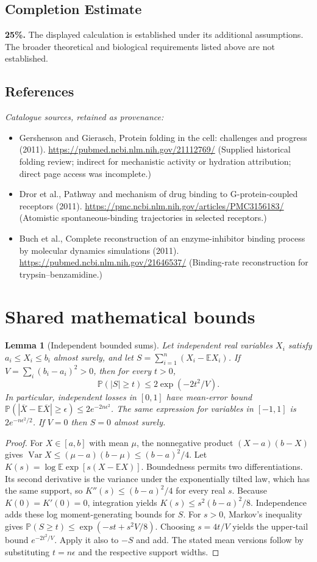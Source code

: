 \documentclass[11pt]{article}
\newcommand{\E}{\mathbb E}
\newcommand{\Prob}{\mathbb P}
\DeclareMathOperator{\Var}{Var}
\providecommand{\E}{\mathbb E}
\providecommand{\Prob}{\mathbb P}
\providecommand{\Var}{\operatorname{Var}}
\newtheorem{sharedlemma}{Lemma}[section]
\begin{document}
\subsection{Completion Estimate}
\textbf{25\%.} The displayed calculation is established under its additional assumptions. The broader theoretical and biological requirements listed above are not established.
\subsection{References}
\noindent\emph{Catalogue sources, retained as provenance:}
\begin{itemize}
\item Gershenson and Gierasch, Protein folding in the cell: challenges and progress (2011). \url{https://pubmed.ncbi.nlm.nih.gov/21112769/} (Supplied historical folding review; indirect for mechanistic activity or hydration attribution; direct page access was incomplete.)
\item Dror et al., Pathway and mechanism of drug binding to G-protein-coupled receptors (2011). \url{https://pmc.ncbi.nlm.nih.gov/articles/PMC3156183/} (Atomistic spontaneous-binding trajectories in selected receptors.)
\item Buch et al., Complete reconstruction of an enzyme-inhibitor binding process by molecular dynamics simulations (2011). \url{https://pubmed.ncbi.nlm.nih.gov/21646537/} (Binding-rate reconstruction for trypsin--benzamidine.)
\end{itemize}
\clearpage


\appendix
\section{Shared mathematical bounds}\label{app:bounds}
\begin{sharedlemma}[Independent bounded sums]\label{lem:bounded}
Let independent real variables $X_i$ satisfy $a_i\leq X_i\leq b_i$ almost surely,
and let $S=\sum_{i=1}^n(X_i-\E X_i)$. If
$V=\sum_i(b_i-a_i)^2>0$, then for every $t>0$,
\[
 \Prob(|S|\geq t)\leq 2\exp(-2t^2/V).
\]
In particular, independent losses in $[0,1]$ have mean-error bound
$\Prob(|\overline X-\E\overline X|\geq\epsilon)
\leq2e^{-2n\epsilon^2}$. The same expression for variables in $[-1,1]$
is $2e^{-n\epsilon^2/2}$. If $V=0$ then $S=0$ almost surely.
\end{sharedlemma}
\begin{proof}
For $X\in[a,b]$ with mean $\mu$, the nonnegative product
$(X-a)(b-X)$ gives
$\Var X\leq(\mu-a)(b-\mu)\leq(b-a)^2/4$.
Let $K(s)=\log\E\exp[s(X-\E X)]$.
Boundedness permits two differentiations. Its second derivative is the variance
under the exponentially tilted law, which has the same support, so
$K''(s)\leq(b-a)^2/4$ for every real $s$.
Because $K(0)=K'(0)=0$, integration yields
$K(s)\leq s^2(b-a)^2/8$.
Independence adds these log moment-generating bounds for $S$.
For $s>0$, Markov's inequality gives
$\Prob(S\geq t)\leq\exp(-st+s^2V/8)$.
Choosing $s=4t/V$ yields the upper-tail bound $e^{-2t^2/V}$.
Apply it also to $-S$ and add. The stated mean versions follow by substituting
$t=n\epsilon$ and the respective support widths.
\end{proof}
\end{document}
